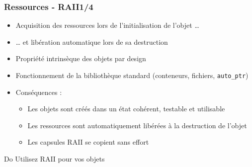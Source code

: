 \documentclass[C++.tex]{subfiles}
\begin{document}
\begin{frame}
	\frametitle{Ressources - RAII\titlehfill{}1/4}


	\begin{itemize}
		\item Acquisition des ressources lors de l'initialisation de l'objet \ldots
		\item \ldots{} et libération automatique lors de sa destruction


		\item Propriété intrinsèque des objets \og par design\fg{}


		\item Fonctionnement de la bibliothèque standard (conteneurs, fichiers, \lstinline|auto_ptr|)
		\item Conséquences :
		\begin{itemize}
			\item Les objets sont créés dans un état cohérent, testable et utilisable
			\item Les ressources sont automatiquement libérées à la destruction de l'objet

			
			\item Les capsules RAII se copient sans effort
		\end{itemize}
	\end{itemize}

	\begin{exampleblock}{Do}
		Utilisez RAII pour vos objets
	\end{exampleblock}
\end{frame}
\end{document}
